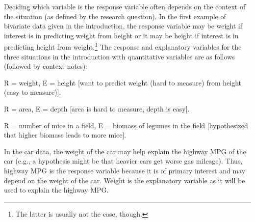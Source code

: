 \documentclass[10pt,openany]{book}\usepackage[]{graphicx}\usepackage[]{color}
\begin{document}

\vspace{-12pt}

Deciding which variable is the response variable often depends on the context of the situation (as defined by the research question).  In the first example of bivariate data given in the introduction, the response variable may be weight if interest is in predicting weight from height or it may be height if interest is in predicting height from weight.\footnote{The latter is usually not the case, though.}  The response and explanatory variables for the three situations in the introduction with quantitative variables are as follows (followed by context notes):
\begin{Itemize}
  \item R = weight, E = height [want to predict weight (hard to measure) from height (easy to measure)].
  \item R = area, E = depth [area is hard to measure, depth is easy].
  \item R = number of mice in a field, E = biomass of legumes in the field [hypothesized that higher biomass leads to more mice].
\end{Itemize}

In the car data, the weight of the car may help explain the highway MPG of the car (e.g., a hypothesis might be that heavier cars get worse gas mileage).  Thus, highway MPG is the response variable because it is of primary interest and may depend on the weight of the car.  Weight is the explanatory variable as it will be used to explain the highway MPG.


\vspace{-6pt}
\end{document}
